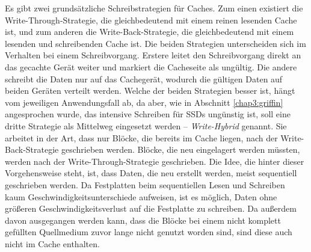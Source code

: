 Es gibt zwei grundsätzliche Schreibstrategien für Caches. Zum einen existiert die Write-Through-Strategie, die gleichbedeutend mit einem reinen lesenden Cache
ist, und zum anderen die Write-Back-Strategie, die gleichbedeutend mit einem lesenden und schreibenden Cache ist. Die beiden Strategien unterscheiden sich im
Verhalten bei einem Schreibvorgang. Erstere leitet den Schreibvorgang direkt an das gecachte Gerät weiter und markiert die Cacheseite als ungültig. Die
andere schreibt die Daten nur auf das Cachegerät, wodurch die gültigen Daten auf beiden Geräten verteilt werden. Welche der beiden Strategien besser ist, hängt vom
jeweiligen Anwendungsfall ab, da aber, wie in Abschnitt \ref{chap3:griffin} angesprochen wurde, das intensive Schreiben für \acp{SSD} ungünstig ist, soll eine
dritte Strategie als Mittelweg eingesetzt werden -- \textit{Write-Hybrid} genannt. Sie arbeitet in der Art, dass nur Blöcke, die bereits im Cache liegen, nach
der Write-Back-Strategie geschrieben werden. Blöcke, die neu eingelagert werden müssten, werden nach der Write-Through-Strategie geschrieben. Die Idee, die hinter
dieser Vorgehensweise steht, ist, dass Daten, die neu erstellt werden, meist sequentiell geschrieben werden. Da Festplatten beim sequentiellen Lesen und
Schreiben kaum Geschwindigkeitsunterschiede aufweisen, ist es möglich, Daten ohne größeren Geschwindigkeitsverlust auf die Festplatte zu schreiben. Da außerdem
davon ausgegangen werden kann, dass die Blöcke bei einem nicht komplett gefüllten Quellmedium zuvor lange nicht genutzt worden sind, sind diese auch nicht im
Cache enthalten.
